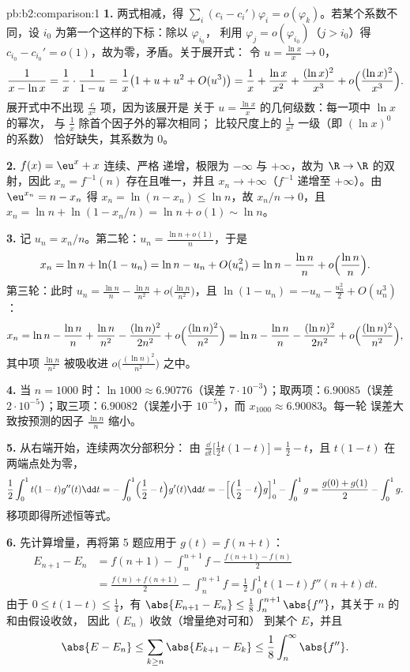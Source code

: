 \begin{solution}{pb:b2:comparison:1}
\textbf{1.} 两式相减，得 $\sum_i (c_i -
c_i')\varphi_i = o(\varphi_k)$。若某个系数不同，设
$i_0$ 为第一个这样的下标：除以 $\varphi_{i_0}$，
利用 $\varphi_j = o(\varphi_{i_0})$（$j > i_0$）得 $c_{i_0} -
c_{i_0}' = o(1)$，故为零，矛盾。关于展开式：
令 $u = \frac{\ln x}x \to 0$，
\[
\frac{1}{x - \ln x} = \frac1x\cdot\frac{1}{1 - u}
= \frac1x\bigl(1 + u + u^2 + O(u^3)\bigr)
= \frac1x + \frac{\ln x}{x^2} + \frac{(\ln x)^2}{x^3} +
o\Bigl(\frac{(\ln x)^2}{x^3}\Bigr).
\]
展开式中不出现 $\frac c{x^2}$ 项，因为该展开是
关于 $u = \frac{\ln x}{x}$ 的几何级数：每一项中 $\ln x$ 的幂次，
与 $\frac1x$ 除首个因子外的幂次相同；
比较尺度上的 $\frac1{x^2}$ 一级（即 $(\ln x)^0$ 的系数）
恰好缺失，其系数为 $0$。

\textbf{2.} $f(x) = \eu^x + x$ 连续、严格
递增，极限为 $-\infty$ 与 $+\infty$，故为
$\R \to \R$ 的双射，因此 $x_n = f^{-1}(n)$ 存在且唯一，并且
$x_n \to +\infty$（$f^{-1}$ 递增至 $+\infty$）。由
$\eu^{x_n} = n - x_n$ 得 $x_n = \ln(n - x_n) \leq \ln n$，故
$x_n/n \to 0$，且 $x_n = \ln n + \ln(1 - x_n/n) = \ln n + o(1)
\sim \ln n$。

\textbf{3.} 记 $u_n = x_n/n$。第二轮：$u_n = \frac{\ln n
+ o(1)}{n}$，于是
\[
x_n = \ln n + \ln(1 - u_n) = \ln n - u_n + O(u_n^2)
= \ln n - \frac{\ln n}{n} + o\Bigl(\frac{\ln n}n\Bigr).
\]
第三轮：此时 $u_n = \frac{\ln n}{n} - \frac{\ln n}{n^2} +
o\bigl(\frac{\ln n}{n^2}\bigr)$，且 $\ln(1 - u_n) = -u_n -
\frac{u_n^2}2 + O(u_n^3)$：
\[
x_n = \ln n - \frac{\ln n}n + \frac{\ln n}{n^2}
- \frac{(\ln n)^2}{2n^2} + o\Bigl(\frac{(\ln
n)^2}{n^2}\Bigr)
= \ln n - \frac{\ln n}{n} - \frac{(\ln n)^2}{2n^2} +
o\Bigl(\frac{(\ln n)^2}{n^2}\Bigr),
\]
其中项 $\frac{\ln n}{n^2}$ 被吸收进
$o\bigl(\frac{(\ln n)^2}{n^2}\bigr)$ 之中。

\textbf{4.} 当 $n = 1000$ 时：$\ln 1000 \approx 6.90776$（误差
$7\cdot10^{-3}$）；取两项：$6.90085$（误差
$2\cdot10^{-5}$）；取三项：$6.90082$（误差小于
$10^{-5}$），而 $x_{1000} \approx 6.90083$。每一轮
误差大致按预测的因子 $\frac{\ln n}{n}$ 缩小。

\textbf{5.} 从右端开始，连续两次分部积分：
由 $\frac{\dd}{\dd t}\bigl[\tfrac12t(1-t)\bigr] = \tfrac12 -
t$，且 $t(1-t)$ 在两端点处为零，
\[
\frac12\int_0^1 t(1-t)g''(t)\dd t
= -\int_0^1\Bigl(\frac12 - t\Bigr)g'(t)\dd t
= -\Bigl[\Bigl(\frac12 - t\Bigr)g\Bigr]_0^1 - \int_0^1 g
= \frac{g(0) + g(1)}2 - \int_0^1 g .
\]
移项即得所述恒等式。

\textbf{6.} 先计算增量，再将第 5 题应用于
$g(t) = f(n + t)$：
\begin{align*}
E_{n+1} - E_n
&= f(n{+}1) - \int_n^{n+1}\!f - \frac{f(n{+}1) - f(n)}2 \\
&= \frac{f(n) + f(n{+}1)}2 - \int_n^{n+1}\!f
= \frac12\int_0^1 t(1-t)f''(n+t)\dd t .
\end{align*}
由于 $0 \leq t(1-t) \leq \frac14$，有 $\abs{E_{n+1} - E_n} \leq
\frac18\int_n^{n+1}\abs{f''}$，其关于 $n$ 的和由假设收敛，
因此 $(E_n)$ 收敛（增量绝对可和）
到某个 $E$，并且
\[
\abs{E - E_n} \leq \sum_{k\geq n}\abs{E_{k+1} - E_k} \leq
\frac18\int_n^\infty\abs{f''} .
\]


\end{solution}
